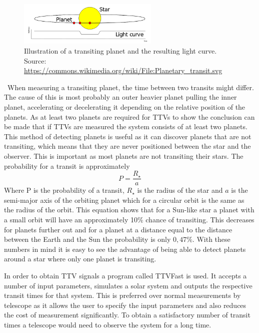 \documentclass[titlepage]{article}
\begin{document}
	\begin{figure}[h!]
		\centering
		\captionsetup{justification=centering}
		\includegraphics[width=0.6\textwidth]{planTrans.png}
		\caption{Illustration of a transiting planet and the resulting light curve. \\  \small{ Source: \url{https://commons.wikimedia.org/wiki/File:Planetary_transit.svg}}}
		\label{fig:trans}
	\end{figure}\
	When measuring a transiting planet, the time between two transits might differ. The cause of this is most probably an outer heavier planet pulling the inner planet, accelerating or decelerating it depending on the relative position of the planets. As at least two planets are required for TTVs to show the conclusion can be made that if TTVs are measured the system consists of at least two planets. This method of detecting planets is useful as it can discover planets that are not transiting, which means that they are never positioned between the star and the observer. This is important as most planets are not transiting their stars. The probability for a transit is approximately 
	\begin{equation}
		P = \frac{R_{\star}}{a}
	\end{equation}
	Where P is the probability of a transit, $R_{\star}$ is the radius of the star and $a$ is the semi-major axis of the orbiting planet which for a circular orbit is the same as the radius of the orbit. \cite{1} This equation shows that for a Sun-like star a planet with a small orbit will have an approximately 10$\%$ chance of transiting. This decreases for planets further out and for a planet at a distance equal to the distance between the Earth and the Sun the probability is only $0,47\%$. With these numbers in mind it is easy to see the advantage of being able to detect planets around a star where only one planet is transiting.
	
	In order to obtain TTV signals a program called TTVFast \nocite{2} is used. It accepts a number of input parameters, simulates a solar system and outputs the respective transit times for that system. This is preferred over normal measurements by telescope as it allows the user to specify the input parameters and also reduces the cost of measurement significantly. To obtain a satisfactory number of transit times a telescope would need to observe the system for a long time.
	
\end{document}
